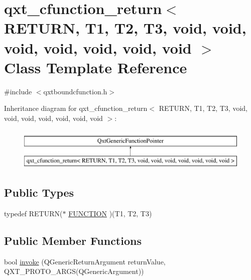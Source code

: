 \hypertarget{classqxt__cfunction__return_3_01_r_e_t_u_r_n_00_01_t1_00_01_t2_00_01_t3_00_01void_00_01void_00_08c629501f46f0b8164288b52f788e233}{\section{qxt\-\_\-cfunction\-\_\-return$<$ R\-E\-T\-U\-R\-N, T1, T2, T3, void, void, void, void, void, void, void $>$ Class Template Reference}
\label{classqxt__cfunction__return_3_01_r_e_t_u_r_n_00_01_t1_00_01_t2_00_01_t3_00_01void_00_01void_00_08c629501f46f0b8164288b52f788e233}
}


{\ttfamily \#include $<$qxtboundcfunction.\-h$>$}

Inheritance diagram for qxt\-\_\-cfunction\-\_\-return$<$ R\-E\-T\-U\-R\-N, T1, T2, T3, void, void, void, void, void, void, void $>$\-:\begin{figure}[H]
\begin{center}
\leavevmode
\includegraphics[height=2.000000cm]{classqxt__cfunction__return_3_01_r_e_t_u_r_n_00_01_t1_00_01_t2_00_01_t3_00_01void_00_01void_00_08c629501f46f0b8164288b52f788e233}
\end{center}
\end{figure}
\subsection*{Public Types}
\begin{DoxyCompactItemize}
\item 
typedef R\-E\-T\-U\-R\-N($\ast$ \hyperlink{classqxt__cfunction__return_3_01_r_e_t_u_r_n_00_01_t1_00_01_t2_00_01_t3_00_01void_00_01void_00_08c629501f46f0b8164288b52f788e233_a81eb36d3be75530b01f7eaa7c9444f7c}{F\-U\-N\-C\-T\-I\-O\-N} )(T1, T2, T3)
\end{DoxyCompactItemize}
\subsection*{Public Member Functions}
\begin{DoxyCompactItemize}
\item 
bool \hyperlink{classqxt__cfunction__return_3_01_r_e_t_u_r_n_00_01_t1_00_01_t2_00_01_t3_00_01void_00_01void_00_08c629501f46f0b8164288b52f788e233_a3fc25e1f92a4fc7cd0b9632fd2a384bd}{invoke} (Q\-Generic\-Return\-Argument return\-Value, Q\-X\-T\-\_\-\-P\-R\-O\-T\-O\-\_\-A\-R\-G\-S(Q\-Generic\-Argument))
\end{DoxyCompactItemize}
